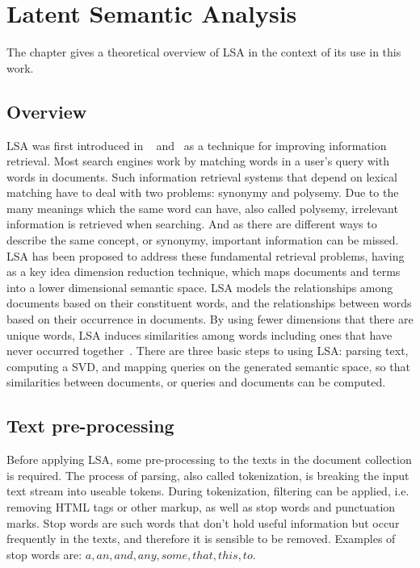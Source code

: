\chapter{Latent Semantic Analysis}
\label{sec:lsa}

\begin{summary}
The chapter gives a theoretical overview of \gls{LSA} in the context of its use in this work.
\end{summary}
 
\section{Overview}

\gls{LSA} was first introduced in ~\cite{Dumais88usingLSA} and~\cite{Deerw90_LSA} as a technique for improving information retrieval. Most search engines work by matching words in a user's query with words in documents. Such information retrieval systems that depend on lexical matching have to deal with two problems: synonymy and polysemy. Due to the many meanings which the same word can have, also called polysemy, irrelevant information is retrieved when searching. And as there are different ways to describe the same concept, or synonymy, important information can be missed. \gls{LSA} has been proposed to address these fundamental retrieval problems, having as a key idea dimension reduction technique, which maps documents and terms into a lower dimensional semantic space. \gls{LSA} models the relationships among documents based on their constituent words, and the relationships between words based on their occurrence in documents. By using fewer dimensions that there are unique words, \gls{LSA} induces similarities among words including ones that have never occurred together~\cite{Dumais2006}. There are three basic steps to using \gls{LSA}: parsing text, computing a \gls{SVD}, and mapping queries on the generated semantic space, so that similarities between documents, or queries and documents can be computed.\\
 
\section{Text pre-processing}

Before applying \gls{LSA}, some pre-processing to the texts in the document collection is required. The process of parsing, also called tokenization, is breaking the input text stream into useable tokens. During tokenization, filtering can be applied, i.e. removing HTML tags or other markup, as well as stop words  and punctuation marks. Stop words are such words that don't hold useful information but occur frequently in the texts, and therefore it is sensible to be removed. Examples of stop words are: $ a, an, and, any, some, that, this, to $. \\


